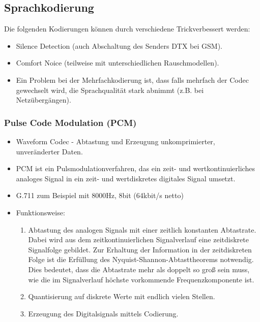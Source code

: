 \documentclass{article} %
\begin{document}
\subsection{Sprachkodierung}
Die folgenden Kodierungen können durch verschiedene \glqq Trick\grqq verbessert werden:
\begin{itemize}
	\item Silence Detection (auch Abschaltung des Senders DTX bei GSM).
	\item Comfort Noice (teilweise mit unterschiedlichen Rauschmodellen).
	\item Ein Problem bei der Mehrfachkodierung ist, dass falls mehrfach der Codec gewechselt wird, die
	Sprachqualität stark abnimmt (z.B. bei Netzübergängen).
\end{itemize}
\subsubsection{Pulse Code Modulation (PCM)}
\begin{itemize}
	\item Waveform Codec - Abtastung und Erzeugung unkomprimierter, unveränderter Daten.
	\item PCM ist ein Pulsmodulationverfahren, das ein zeit- und wertkontinuierliches analoges Signal in ein zeit- und wertdiskretes digitales Signal umsetzt.
	\item G.711 zum Beispiel mit 8000Hz, 8bit (64kbit/s netto)
	\item Funktionsweise:
	\begin{enumerate}
		\item Abtastung des analogen Signals mit einer zeitlich konstanten Abtastrate. Dabei wird aus dem zeitkontinuierlichen Signalverlauf eine zeitdiskrete Signalfolge gebildet. Zur Erhaltung der Information in der zeitdiskreten Folge ist die Erfüllung des Nyquist-Shannon-Abtasttheorems notwendig. Dies bedeutet, dass die Abtastrate mehr als doppelt so groß sein muss, wie die im Signalverlauf höchste vorkommende Frequenzkomponente ist.
		\item Quantisierung auf diskrete Werte mit endlich vielen Stellen.
		\item Erzeugung des Digitalsignals mittels Codierung.
	\end{enumerate}
\end{itemize}
\end{document}
